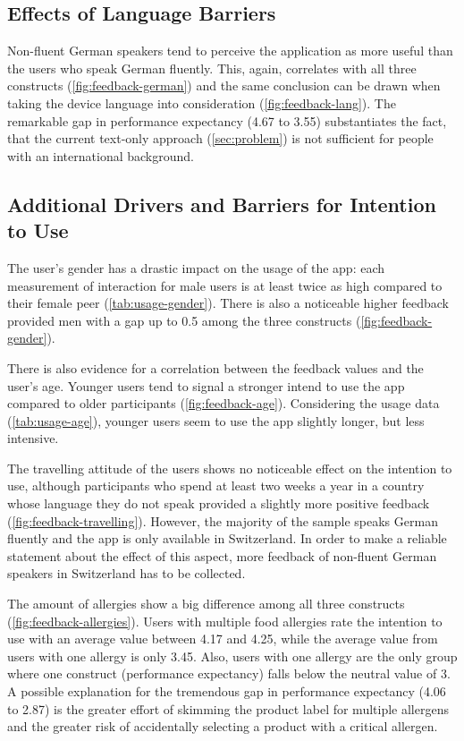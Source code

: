 \subsection{Effects of Language Barriers}
Non-fluent German speakers tend to perceive the application as more useful than the users who speak German fluently. This, again, correlates with all three constructs (\cref{fig:feedback-german}) and the same conclusion can be drawn when taking the device language into consideration (\cref{fig:feedback-lang}). The remarkable gap in performance expectancy (4.67 to 3.55) substantiates the fact, that the current text-only approach (\cref{sec:problem}) is not sufficient for people with an international background.

\subsection{Additional Drivers and Barriers for Intention to Use}
The user's gender has a drastic impact on the usage of the app: each measurement of interaction for male users is at least twice as high compared to their female peer (\cref{tab:usage-gender}). There is also a noticeable higher feedback provided men with a gap up to 0.5 among the three constructs (\cref{fig:feedback-gender}).

There is also evidence for a correlation between the feedback values and the user's age. Younger users tend to signal a stronger intend to use the app compared to older participants (\cref{fig:feedback-age}). Considering the usage data (\cref{tab:usage-age}), younger users seem to use the app slightly longer, but less intensive.

The travelling attitude of the users shows no noticeable effect on the intention to use, although participants who spend at least two weeks a year in a country whose language they do not speak provided a slightly more positive feedback (\cref{fig:feedback-travelling}). However, the majority of the sample speaks German fluently and the app is only available in Switzerland. In order to make a reliable statement about the effect of this aspect, more feedback of non-fluent German speakers in Switzerland has to be collected. 

The amount of allergies show a big difference among all three constructs (\cref{fig:feedback-allergies}). Users with multiple food allergies rate the intention to use with an average value between 4.17 and 4.25, while the average value from users with one allergy is only 3.45. Also, users with one allergy are the only group where one construct (performance expectancy) falls below the neutral value of 3. A possible explanation for the tremendous gap in performance expectancy (4.06 to 2.87) is the greater effort of skimming the product label for multiple allergens and the greater risk of accidentally selecting a product with a critical allergen.

